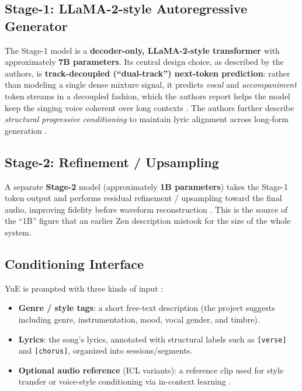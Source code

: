 \documentclass[11pt,a4paper]{article}
\begin{document}
\subsection{Stage-1: LLaMA-2-style Autoregressive Generator}

The Stage-1 model is a \textbf{decoder-only, LLaMA-2-style transformer}
\cite{yuan2025yue,touvron2023llama2} with approximately \textbf{7B parameters}.
Its central design choice, as described by the authors, is \textbf{track-decoupled
(``dual-track'') next-token prediction}: rather than modeling a single dense
mixture signal, it predicts \emph{vocal} and \emph{accompaniment} token streams in
a decoupled fashion, which the authors report helps the model keep the singing
voice coherent over long contexts \cite{yuan2025yue}. The authors further describe
\emph{structural progressive conditioning} to maintain lyric alignment across
long-form generation \cite{yuan2025yue}.

\subsection{Stage-2: Refinement / Upsampling}

A separate \textbf{Stage-2} model (approximately \textbf{1B parameters}) takes the
Stage-1 token output and performs residual refinement / upsampling toward the
final audio, improving fidelity before waveform reconstruction \cite{yuegh,yuehf}.
This is the source of the ``1B'' figure that an earlier Zen description mistook for
the size of the whole system.

\subsection{Conditioning Interface}

YuE is prompted with three kinds of input \cite{yuehf}:

\begin{itemize}
    \item \textbf{Genre / style tags}: a short free-text description (the project
    suggests including genre, instrumentation, mood, vocal gender, and timbre).
    \item \textbf{Lyrics}: the song's lyrics, annotated with structural labels such
    as \texttt{[verse]} and \texttt{[chorus]}, organized into sessions/segments.
    \item \textbf{Optional audio reference} (ICL variants): a reference clip used
    for style transfer or voice-style conditioning via in-context learning
    \cite{yuan2025yue}.
\end{itemize}
\end{document}
